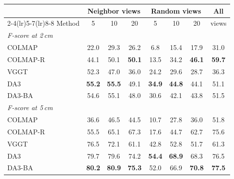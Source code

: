 \begin{tabular}{lccccccc}
\toprule
 & \multicolumn{3}{c}{Neighbor views} & \multicolumn{3}{c}{Random views} & All \\
\cmidrule(lr){2-4}\cmidrule(lr){5-7}\cmidrule(lr){8-8}
Method & 5 & 10 & 20 & 5 & 10 & 20 & views \\
\midrule
\multicolumn{8}{l}{\emph{F-score at 2\,cm}} \\
COLMAP & 22.0 & 29.3 & 26.2 & 6.8 & 15.4 & 17.9 & 31.0 \\
COLMAP-R & 44.1 & 50.1 & \textbf{50.1} & 13.5 & 34.2 & \textbf{46.1} & \textbf{59.7} \\
VGGT & 52.3 & 47.0 & 36.0 & 24.2 & 29.6 & 28.7 & 36.3 \\
DA3 & \textbf{55.2} & \textbf{55.5} & 49.1 & \textbf{34.9} & \textbf{44.8} & 44.1 & 51.1 \\
DA3-BA & 54.6 & 55.1 & 48.0 & 30.6 & 42.1 & 43.8 & 51.5 \\
\midrule
\multicolumn{8}{l}{\emph{F-score at 5\,cm}} \\
COLMAP & 36.6 & 46.5 & 44.5 & 10.7 & 27.8 & 36.0 & 51.8 \\
COLMAP-R & 55.5 & 65.1 & 67.3 & 17.6 & 44.7 & 62.7 & 75.6 \\
VGGT & 76.5 & 72.1 & 61.1 & 42.8 & 52.8 & 51.7 & 61.3 \\
DA3 & 79.7 & 79.6 & 74.2 & \textbf{54.4} & \textbf{68.9} & 68.3 & 76.5 \\
DA3-BA & \textbf{80.2} & \textbf{80.9} & \textbf{75.3} & 52.0 & 66.9 & \textbf{70.8} & \textbf{77.5} \\
\bottomrule
\end{tabular}
